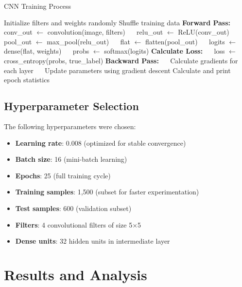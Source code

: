\documentclass[conference]{IEEEtran}
\begin{document}
\begin{algorithm}[H]
\caption{CNN Training Process}
\label{alg:training}
\begin{algorithmic}[1]
\STATE Initialize filters and weights randomly
    \STATE Shuffle training data
        \STATE \textbf{Forward Pass:}
        \STATE $\quad$ conv\_out $\leftarrow$ convolution(image, filters)
        \STATE $\quad$ relu\_out $\leftarrow$ ReLU(conv\_out)
        \STATE $\quad$ pool\_out $\leftarrow$ max\_pool(relu\_out)
        \STATE $\quad$ flat $\leftarrow$ flatten(pool\_out)
        \STATE $\quad$ logits $\leftarrow$ dense(flat, weights)
        \STATE $\quad$ probs $\leftarrow$ softmax(logits)
        \STATE
        \STATE \textbf{Calculate Loss:}
        \STATE $\quad$ loss $\leftarrow$ cross\_entropy(probs, true\_label)
        \STATE
        \STATE \textbf{Backward Pass:}
        \STATE $\quad$ Calculate gradients for each layer
        \STATE $\quad$ Update parameters using gradient descent
    \ENDFOR
    \STATE Calculate and print epoch statistics
\ENDFOR
\end{algorithmic}
\end{algorithm}

\subsection{Hyperparameter Selection}
The following hyperparameters were chosen:
\begin{itemize}
    \item \textbf{Learning rate}: 0.008 (optimized for stable convergence)
    \item \textbf{Batch size}: 16 (mini-batch learning)
    \item \textbf{Epochs}: 25 (full training cycle)
    \item \textbf{Training samples}: 1,500 (subset for faster experimentation)
    \item \textbf{Test samples}: 600 (validation subset)
    \item \textbf{Filters}: 4 convolutional filters of size 5×5
    \item \textbf{Dense units}: 32 hidden units in intermediate layer
\end{itemize}

\section{Results and Analysis}
\end{document}
